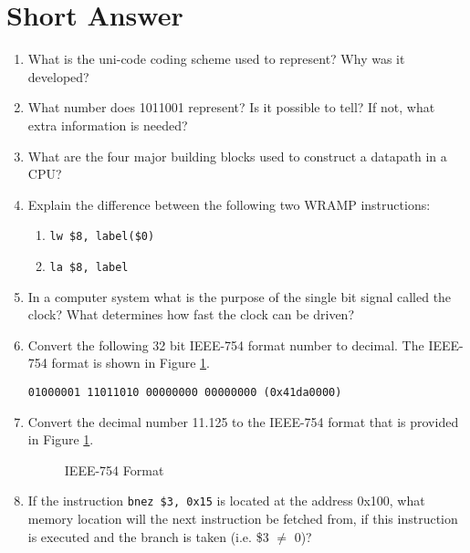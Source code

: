 \documentclass[a4paper,10pt]{article}
\begin{document}
\newpage
\section{Short Answer}

\begin{enumerate}

\item What is the uni-code coding scheme used to represent? Why was it
developed?  

\item What number does 1011001 represent? Is it possible to tell? If
not, what extra information is needed? 

\item What are the four major building blocks used to construct a
datapath in a CPU?

\item Explain the difference between the following two WRAMP instructions:
\begin{enumerate}
    \item \texttt{lw  \$8, label(\$0)}
    \item \texttt{la  \$8, label}
\end{enumerate}

\item In a computer system what is the purpose of the single
bit signal called the clock? What determines how fast the clock can be
driven? 

\item Convert the following 32 bit IEEE-754 format number to decimal.
The IEEE-754 format is shown in Figure \ref{fig:ieee754}.
\begin{center}
\texttt{01000001 11011010 00000000 00000000 (0x41da0000)}
\end{center}

\item Convert the decimal number 11.125 to the IEEE-754 format that is
provided in Figure \ref{fig:ieee754}.  

\begin{figure}[h]
\begin{center}
    \caption{IEEE-754 Format}
    \label{fig:ieee754}
  \end{center}
\end{figure}

\item If the instruction \texttt{bnez \$3, 0x15} is located at the
address 0x100,  what memory location will the next instruction be
fetched from, if this instruction is executed and the branch is taken
(i.e. \$3 $\neq$ 0)? 


\end{enumerate}
\end{document}
